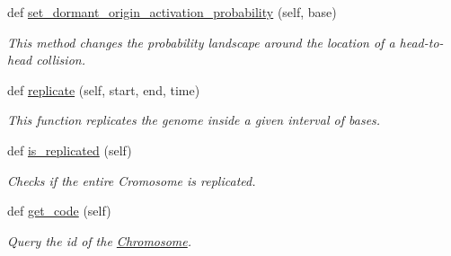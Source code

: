 \begin{DoxyCompactItemize}
def \mbox{\hyperlink{classsrc_1_1chromosome_1_1Chromosome_a9d9954253a26f26823b2d58ad3cf82ed}{set\+\_\+dormant\+\_\+origin\+\_\+activation\+\_\+probability}} (self, base)
\begin{DoxyCompactList}\small\item\em This method changes the probability landscape around the location of a head-\/to-\/head collision. \end{DoxyCompactList}\item 
def \mbox{\hyperlink{classsrc_1_1chromosome_1_1Chromosome_a038cd43cf60fc2ad2b5775ebe43b34de}{replicate}} (self, start, end, time)
\begin{DoxyCompactList}\small\item\em This function replicates the genome inside a given interval of bases. \end{DoxyCompactList}\item 
def \mbox{\hyperlink{classsrc_1_1chromosome_1_1Chromosome_a75f3d66aaaf16d67ebdfe03d6eff9d80}{is\+\_\+replicated}} (self)
\begin{DoxyCompactList}\small\item\em Checks if the entire Cromosome is replicated. \end{DoxyCompactList}\item 
def \mbox{\hyperlink{classsrc_1_1chromosome_1_1Chromosome_ab718a539f93dd0b2d7d5d299de3d9532}{get\+\_\+code}} (self)
\begin{DoxyCompactList}\small\item\em Query the id of the \mbox{\hyperlink{classsrc_1_1chromosome_1_1Chromosome}{Chromosome}}. \end{DoxyCompactList}\end{DoxyCompactItemize}
